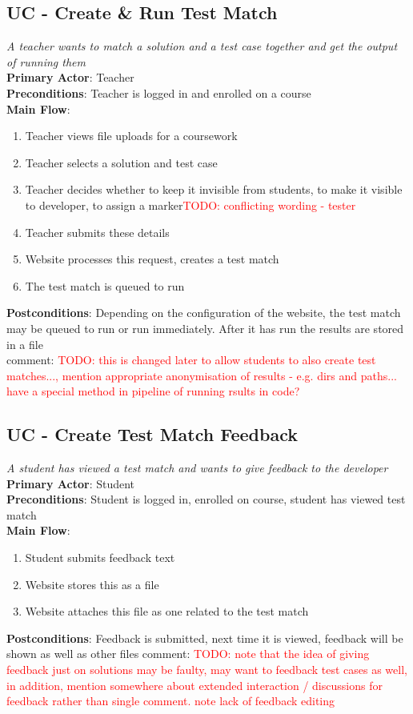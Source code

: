 \documentclass[a4paper,11pt]{report}
\newcommand{\todo}[1]{\textcolor{red}{TODO: #1}}
\begin{document}
\subsection*{UC - Create \& Run Test Match}
\textit{A teacher wants to match a solution and a test case together and get the output of running them}\\
\textbf{Primary Actor}: Teacher\\
\textbf{Preconditions}: Teacher is logged in and enrolled on a course\\
\textbf{Main Flow}:
\begin{enumerate}
\item Teacher views file uploads for a coursework
\item Teacher selects a solution and test case
\item Teacher decides whether to keep it invisible from students, to make it visible to developer, to assign a marker\todo{conflicting wording - tester}
\item Teacher submits these details
\item Website processes this request, creates a test match
\item The test match is queued to run
\end{enumerate}
\textbf{Postconditions}: Depending on the configuration of the website, the test match may be queued to run or run immediately. After it has run the results are stored in a file\\
comment: \todo{this is changed later to allow students to also create test matches..., mention appropriate anonymisation of results - e.g. dirs and paths... have a special method in pipeline of running rsults in code?}

\subsection*{UC - Create Test Match Feedback}
\textit{A student has viewed a test match and wants to give feedback to the developer}\\
\textbf{Primary Actor}: Student\\
\textbf{Preconditions}: Student is logged in, enrolled on course, student has viewed test match\\
\textbf{Main Flow}:
\begin{enumerate}
\item Student submits feedback text
\item Website stores this as a file
\item Website attaches this file as one related to the test match
\end{enumerate}
\textbf{Postconditions}: Feedback is submitted, next time it is viewed, feedback will be shown as well as other files
comment: \todo{note that the idea of giving feedback just on solutions may be faulty, may want to feedback test cases as well, in addition, mention somewhere about extended interaction / discussions for feedback rather than single  comment. note lack of feedback editing}
\end{document}
